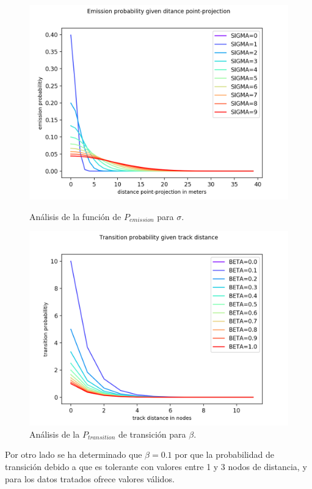 \begin{figure}[!htb]
\begin{minipage}{0.46\textwidth}
\centering
\includegraphics[width=1.2\textwidth]{./Imagenes/EmissionProb.png}
\caption{Análisis de la función de $P_{emission}$ para $\sigma$.}
\label{figure:EmissionProb}
\end{minipage}\hfill
\begin{minipage}{0.46\textwidth}
\centering
\includegraphics[width=1.2\textwidth]{./Imagenes/TransitionProb.png}
\caption{Análisis de la $P_{transition}$ de transición para $\beta$.}
\label{figure:TransitionProb}
\end{minipage}
\end{figure}
Por otro lado se ha determinado que $\beta = 0.1$ por que la probabilidad de transición 
debido a que es tolerante con valores entre 1 y 3 nodos de distancia, y para los datos tratados ofrece valores válidos.

